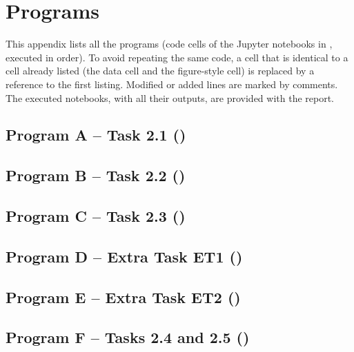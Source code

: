\section{Programs}
\label{app:code}
This appendix lists all the programs (code cells of the Jupyter notebooks in , executed
in order). To avoid repeating the same code, a cell that is identical to a cell already listed (the data
cell  and the figure-style cell) is replaced by a reference to the first listing.
Modified or added lines are marked by comments. The executed notebooks, with all their outputs, are
provided with the report.

\subsection{Program A -- Task 2.1 ()}


\subsection{Program B -- Task 2.2 ()}


\subsection{Program C -- Task 2.3 ()}


\subsection{Program D -- Extra Task ET1 ()}


\subsection{Program E -- Extra Task ET2 ()}


\subsection{Program F -- Tasks 2.4 and 2.5 ()}


